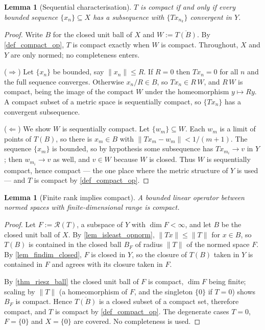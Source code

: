 \documentclass[a4paper]{report}
\theoremstyle{plain}
\newtheorem{lemma}[theorem]{Lemma}
\theoremstyle{definition}
\theoremstyle{remark}
\begin{document}
\begin{lemma}[Sequential characterisation]
  \label{lem_compact_seq}
  $T$ is compact if and only if every bounded sequence $\{x_n\} \subseteq X$ has a
  subsequence with $\{Tx_{n_k}\}$ convergent in $Y$.
\end{lemma}
\begin{proof}
  Write $B$ for the closed unit ball of $X$ and $W := \overline{T(B)}$.  By
  \cref{def_compact_op}, $T$ is compact exactly when $W$ is compact.  Throughout, $X$ and
  $Y$ are only normed; no completeness enters.

  ($\Rightarrow$)  Let $\{x_n\}$ be bounded, say $\|x_n\| \le R$.  If $R = 0$ then
  $Tx_n = 0$ for all $n$ and the full sequence converges.  Otherwise $x_n/R \in B$, so
  $Tx_n \in R\,W$, and $R\,W$ is compact, being the image of the compact $W$ under the
  homeomorphism $y \mapsto Ry$.  A compact subset of a metric space is sequentially
  compact, so $\{Tx_n\}$ has a convergent subsequence.

  ($\Leftarrow$)  We show $W$ is sequentially compact.  Let $\{w_m\} \subseteq W$.  Each
  $w_m$ is a limit of points of $T(B)$, so there is $x_m \in B$ with
  $\|Tx_m - w_m\| < 1/(m+1)$.  The sequence $\{x_m\}$ is bounded, so by hypothesis some
  subsequence has $Tx_{m_i} \to v$ in $Y$; then $w_{m_i} \to v$ as well, and $v \in W$
  because $W$ is closed.  Thus $W$ is sequentially compact, hence compact --- the one place
  where the metric structure of $Y$ is used --- and $T$ is compact by \cref{def_compact_op}.
\end{proof}


\begin{lemma}[Finite rank implies compact]
  \label{lem_finrank_compact}
  A bounded linear operator between normed spaces with finite-dimensional range is
  compact.
\end{lemma}
\begin{proof}
  Let $F := \mathcal{R}(T)$, a subspace of $Y$ with $\dim F < \infty$, and let $B$ be the
  closed unit ball of $X$.  By \cref{lem_isleast_opnorm}, $\|Tx\| \le \|T\|$ for $x \in B$,
  so $T(B)$ is contained in the closed ball $B_F$ of radius $\|T\|$ of the normed space
  $F$.  By \cref{lem_findim_closed}, $F$ is closed in $Y$, so the closure of $T(B)$ taken
  in $Y$ is contained in $F$ and agrees with its closure taken in $F$.

  By \cref{thm_riesz_ball} the closed unit ball of $F$ is compact, $\dim F$ being finite;
  scaling by $\|T\|$ (a homeomorphism of $F$, and the singleton $\{0\}$ if $T = 0$) shows
  $B_F$ is compact.  Hence $\overline{T(B)}$ is a closed subset of a compact set, therefore
  compact, and $T$ is compact by \cref{def_compact_op}.  The degenerate cases $T = 0$,
  $F = \{0\}$ and $X = \{0\}$ are covered.  No completeness is used.
\end{proof}
\end{document}
